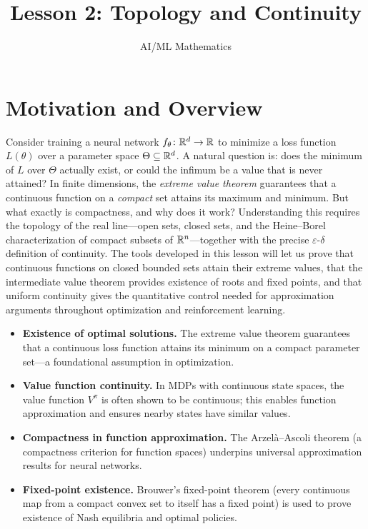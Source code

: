 \documentclass[11pt,a4paper]{article}
\title{Lesson 2: Topology and Continuity}
\author{AI/ML Mathematics}
\date{}
\begin{document}
\maketitle
\tableofcontents
\newpage

\section{Motivation and Overview}
\label{sec:motivation}

Consider training a neural network $f_\theta \colon \mathbb{R}^d \to \mathbb{R}$ to minimize
a loss function $L(\theta)$ over a parameter space $\Theta \subseteq \mathbb{R}^d$.
A natural question is: does the minimum of $L$ over $\Theta$ actually
exist, or could the infimum be a value that is never attained? In finite
dimensions, the \emph{extreme value theorem} guarantees that a continuous
function on a \emph{compact} set attains its maximum and minimum. But what
exactly is compactness, and why does it work? Understanding this requires
the topology of the real line---open sets, closed sets, and the
Heine--Borel characterization of compact subsets of $\mathbb{R}^n$---together
with the precise $\varepsilon$-$\delta$ definition of continuity. The tools
developed in this lesson will let us prove that continuous functions on
closed bounded sets attain their extreme values, that the intermediate
value theorem provides existence of roots and fixed points, and that
uniform continuity gives the quantitative control needed for approximation
arguments throughout optimization and reinforcement learning.

\begin{rlconnection}[title={Why RL/ML needs topology and continuity}]
\begin{itemize}[nosep]
  \item \textbf{Existence of optimal solutions.} The extreme value theorem
    guarantees that a continuous loss function attains its minimum on a
    compact parameter set---a foundational assumption in optimization.
  \item \textbf{Value function continuity.} In MDPs with continuous state
    spaces, the value function $V^\pi$ is often shown to be continuous;
    this enables function approximation and ensures nearby states have
    similar values.
  \item \textbf{Compactness in function approximation.} The
    Arzel\`{a}--Ascoli theorem (a compactness criterion for function
    spaces) underpins universal approximation results for neural networks.
  \item \textbf{Fixed-point existence.} Brouwer's fixed-point theorem
    (every continuous map from a compact convex set to itself has a fixed
    point) is used to prove existence of Nash equilibria and optimal
    policies.
\end{itemize}
\end{rlconnection}
\end{document}
